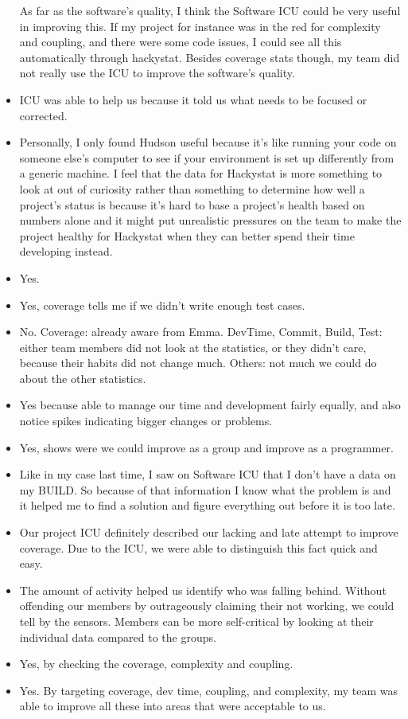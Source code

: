 \begin{itemize}
As far as the software's quality, I think the Software ICU could be very useful in improving this. If my project for instance was in the red for complexity and coupling, and there were some code issues, I could see all this automatically through hackystat. Besides coverage stats though, my team did not really use the ICU to improve the software's quality.
\item ICU was able to help us because it told us what needs to be focused or corrected.
\item Personally, I only found Hudson useful because it's like running your code on someone else's computer to see if your environment is set up differently from a generic machine. I feel that the data for Hackystat is more something to look at out of curiosity rather than something to determine how well a project's status is because it's hard to base a project's health based on numbers alone and it might put unrealistic pressures on the team to make the project healthy for Hackystat when they can better spend their time developing instead.
\item Yes.
\item Yes, coverage tells me if we didn't write enough test cases.
\item No.  
Coverage: already aware from Emma.  
DevTime, Commit, Build, Test: either team members did not look at the statistics, or they didn't care, because their habits did not change much.
Others: not much we could do about the other statistics.
\item Yes because able to manage our time and development fairly equally, and also notice spikes indicating bigger changes or problems.
\item Yes, shows were we could improve as a group and improve as a programmer.
\item Like in my case last time, I saw on Software ICU that I don't have a data on my BUILD. So because of that information I know what the problem is and it helped me to find a solution and figure everything out before it is too late.
\item Our project ICU definitely described our lacking and late attempt to improve coverage. Due to the ICU, we were able to distinguish this fact quick and easy. 
\item The amount of activity helped us identify who was falling behind.  Without offending our members by outrageously claiming their not working, we could tell by the sensors.  Members can be more self-critical by looking at their individual data compared to the groups.
\item Yes, by checking the coverage, complexity and coupling.
\item Yes.  By targeting coverage, dev time, coupling, and complexity, my team was able to improve all these into areas that were acceptable to us.
\end{itemize}

